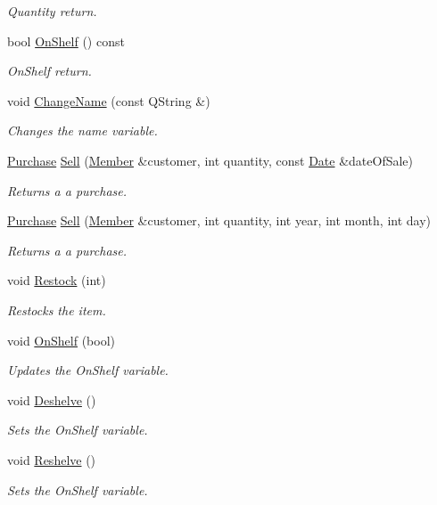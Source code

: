 \begin{DoxyCompactItemize}
\begin{DoxyCompactList}\small\item\em Quantity return. \end{DoxyCompactList}\item 
bool \hyperlink{class_item_a782f7033019bf2dffe30d27dc830d446}{On\+Shelf} () const 
\begin{DoxyCompactList}\small\item\em On\+Shelf return. \end{DoxyCompactList}\item 
void \hyperlink{class_item_a0894d05d3d755dfae05494f1a8c6ed75}{Change\+Name} (const Q\+String \&)
\begin{DoxyCompactList}\small\item\em Changes the name variable. \end{DoxyCompactList}\item 
\hyperlink{class_item_1_1_purchase}{Purchase} \hyperlink{class_item_ab7b5bcc75c974fdf2f9b6f07098e8754}{Sell} (\hyperlink{class_member}{Member} \&customer, int quantity, const \hyperlink{class_date}{Date} \&date\+Of\+Sale)
\begin{DoxyCompactList}\small\item\em Returns a a purchase. \end{DoxyCompactList}\item 
\hyperlink{class_item_1_1_purchase}{Purchase} \hyperlink{class_item_a7465f0baad50838b38c23911f52ee9a6}{Sell} (\hyperlink{class_member}{Member} \&customer, int quantity, int year, int month, int day)
\begin{DoxyCompactList}\small\item\em Returns a a purchase. \end{DoxyCompactList}\item 
void \hyperlink{class_item_afc6aeeca0e43ca1c3513b0370fd40670}{Restock} (int)
\begin{DoxyCompactList}\small\item\em Restocks the item. \end{DoxyCompactList}\item 
void \hyperlink{class_item_ae2744222e97a9b4623be795abfcd7094}{On\+Shelf} (bool)
\begin{DoxyCompactList}\small\item\em Updates the On\+Shelf variable. \end{DoxyCompactList}\item 
void \hyperlink{class_item_a91f7b7b763838c9d806eef30d0e70bfc}{Deshelve} ()
\begin{DoxyCompactList}\small\item\em Sets the On\+Shelf variable. \end{DoxyCompactList}\item 
void \hyperlink{class_item_abb31702d0e49dbaa5f7f7e53ca081698}{Reshelve} ()
\begin{DoxyCompactList}\small\item\em Sets the On\+Shelf variable. \end{DoxyCompactList}\end{DoxyCompactItemize}


